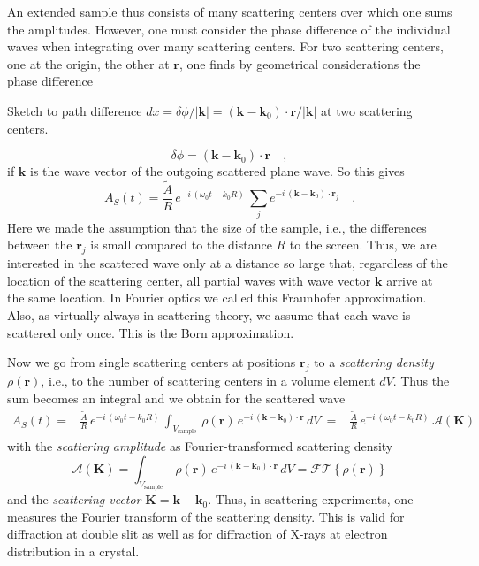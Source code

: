 An extended sample thus consists of many scattering centers over which one sums the amplitudes. However, one must consider the phase difference of the individual waves when integrating over many scattering centers. For two scattering centers, one at the origin, the other at $\mathbf{r}$, one finds by geometrical considerations the phase difference
%
\begin{marginfigure}
\caption{Sketch to path difference $dx = \delta \phi / | \mathbf{k}|= ( \mathbf{k} - \mathbf{k}_0 ) \cdot \mathbf{r} / |\mathbf{k}| $ at two scattering centers.}
\end{marginfigure}
%
\begin{equation}
\delta \phi = ( \mathbf{k} - \mathbf{k}_0 ) \cdot \mathbf{r} \quad ,
\end{equation}
if $\mathbf{k}$ is the wave vector of the outgoing scattered plane wave. So this gives
\begin{equation}
  A_S(t) = \frac{\tilde{A}}{R} \, e^{- i \, (\omega_0 t - k_0 R)} \,
  \sum_j e^{- i \, ( \mathbf{k} - \mathbf{k}_0 ) \cdot \mathbf{r}_j} \quad .
\end{equation}
Here we made the assumption that the size of the sample, i.e., the differences between the $\mathbf{r}_j$ is small compared to the distance $R$ to the screen. Thus, we are interested in the scattered wave only at a distance so large that, regardless of the location of the scattering center, all partial waves with wave vector $\mathbf{k}$ arrive at the same location. In Fourier optics we called this Fraunhofer approximation. Also, as virtually always in scattering theory, we assume that each wave is scattered only once. This is the Born approximation. 

Now we go from single scattering centers at positions $\mathbf{r}_j$ to a \emph{scattering density} $\rho(\mathbf{r})$, i.e., to the number of scattering centers in a volume element $dV$. Thus the sum becomes an integral and we obtain for the scattered wave
\begin{align}
 A_S(t) = & \frac{\tilde{A}}{R} \, e^{- i \, (\omega_0 t - k_0 R)} \,
  \int_{V_\text{sample}} \, \rho( \mathbf{r}) \, e^{- i \, ( \mathbf{k} - \mathbf{k}_0 ) \cdot \mathbf{r}} \, dV \
  = & \frac{\tilde{A}}{R} \, e^{- i \, (\omega_0 t - k_0 R)} \, \mathcal{A}(\mathbf{K}) 
\end{align}
with the \emph{scattering amplitude} as Fourier-transformed scattering density
\begin{equation}
\mathcal{A}(\mathbf{K}) = \int_{V_\text{sample}} \, \rho( \mathbf{r}) \, e^{- i \, ( \mathbf{k} - \mathbf{k}_0 ) \cdot \mathbf{r}} \, dV = \mathcal{FT} \left\{ \rho( \mathbf{r}) \right\} \label{eq:4_scattering_amplitude}
\end{equation}
and the \emph{scattering vector} $\mathbf{K} = \mathbf{k} - \mathbf{k}_0$. Thus, in scattering experiments, one measures the Fourier transform of the scattering density. This is valid for diffraction at double slit as well as for diffraction of X-rays at electron distribution in a crystal. 



